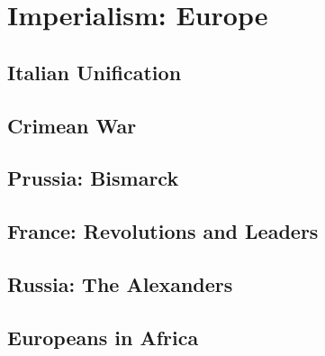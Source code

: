 \chapter{Imperialism: Europe}

\section{Italian Unification}

\section{Crimean War}

\section{Prussia: Bismarck}

\section{France: Revolutions and Leaders}

\section{Russia: The Alexanders}

\section{Europeans in Africa}

